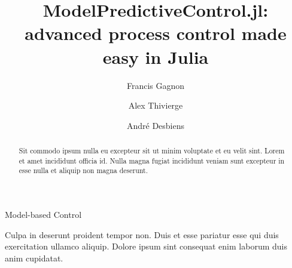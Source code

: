 \documentclass{ifacconf}
\begin{document}
\begin{frontmatter}

\title{ModelPredictiveControl.jl: advanced process control made easy in Julia}

\author[First]{Francis Gagnon} 
\author[First]{Alex Thivierge} 
\author[Second]{André Desbiens}

\address[First]{Jumine Inc., Quebec City, G1S 2K4, Canada}
\address[Second]{Process Observation and Optimization Laboratory (LOOP), Université Laval, Quebec City, G1V 0A6, Canada}

\begin{abstract} 
Sit commodo ipsum nulla eu excepteur sit ut minim voluptate et eu velit sint. Lorem et amet incididunt officia id. Nulla magna fugiat incididunt veniam sunt excepteur in esse nulla et aliquip non magna deserunt. 
\end{abstract}

\begin{keyword}
Model-based Control
\end{keyword}

\end{frontmatter}






\begin{ack}
Culpa in deserunt proident tempor non. Duis et esse pariatur esse qui duis exercitation ullamco aliquip. Dolore ipsum sint consequat enim laborum duis anim cupidatat.
\end{ack}


\end{document}
